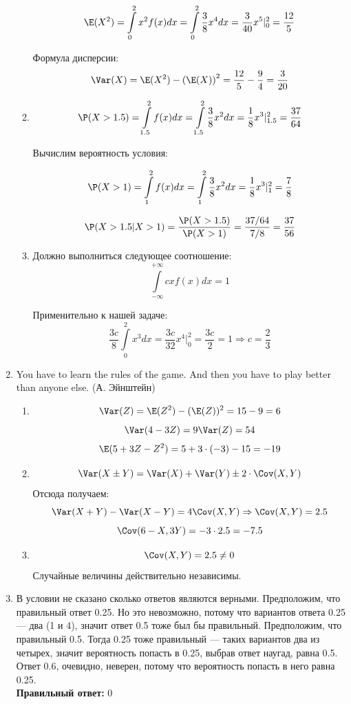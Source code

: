 \begin{enumerate}
\begin{enumerate}
\[\E(X^2) = \int \limits_0^2 x^2 f(x) dx = \int \limits_0^2 \frac{3}{8} x^4 dx = \frac{3}{40} x^5 |_0^2 = \frac{12}{5}\]

Формула дисперсии:
\[\Var(X) = \E(X^2) - \left(\E(X) \right)^2 = \frac{12}{5} - \frac{9}{4} = \frac{3}{20} \]

\item \[\P(X>1.5) = \int \limits_{1.5}^2 f(x) dx = \int \limits_{1.5}^2 \frac{3}{8} x^2 dx = \frac{1}{8} x^3 |_{1.5}^2 = \frac{37}{64}\]

Вычислим вероятность условия:

\[\P(X>1) = \int \limits_1^2 f(x) dx = \int \limits_1^2 \frac{3}{8} x^2 dx = \frac{1}{8} x^3 |_1^2 = \frac{7}{8}\]

\[\P(X>1.5 | X>1) = \frac{\P(X>1.5)}{\P( X>1)} = \frac{37/64}{7/8} = \frac{37}{56}\]

\item Должно выполниться следующее соотношение:
\[\int \limits_{-\infty}^{+\infty} c x f(x) dx  = 1\]

Применительно к нашей задаче:
\[\frac{3c}{8} \int \limits_0^2 x^3 dx  = \frac{3c}{32} x^4 |_0^2 = \frac{3c}{2} = 1 \Rightarrow c = \frac{2}{3}\]
\end{enumerate}

\item
You have to learn the rules of the game. And then you have to play better than anyone else. (А. Эйнштейн)

\begin{enumerate}
\item \[\Var(Z) = \E(Z^2) - (\E(Z))^2 = 15 - 9 = 6\]
\[\Var(4 - 3Z) = 9\Var(Z) = 54\]
\[\E(5 + 3Z - Z^2) = 5 + 3\cdot (-3)  - 15 = -19 \]

\item \[\Var(X \pm Y) = \Var(X) + \Var(Y) \pm 2 \cdot \Cov(X, Y)\]
Отсюда получаем:
\[\Var(X + Y) - \Var(X - Y) = 4 \Cov(X, Y) \Rightarrow \Cov(X, Y) = 2.5\]
\[\Cov(6 - X, 3Y) = -3\cdot 2.5 = -7.5\]

\item \[\Cov(X, Y) = 2.5 \ne 0\] Случайные величины действительно независимы.
\end{enumerate}


\item
 В условии не сказано сколько ответов являются верными. Предположим, что правильный ответ 0.25. Но это невозможно, потому что вариантов ответа 0.25 — два (1 и 4), значит ответ 0.5 тоже был бы правильный. Предположим, что правильный 0.5. Тогда 0.25 тоже правильный — таких вариантов два из четырех, значит вероятность попасть в 0.25, выбрав ответ наугад, равна 0.5. Ответ 0.6, очевидно, неверен, потому что вероятность попасть в него равна 0.25. \\
\textbf{Правильный ответ:} 0


\end{enumerate}
